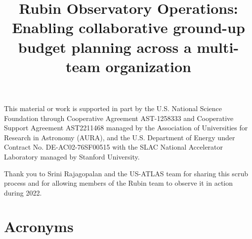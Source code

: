 \documentclass[]{spie}
\begin{document}

\title{Rubin Observatory Operations: Enabling collaborative ground-up budget planning across a multi-team organization}


\maketitle






\acknowledgments
This material or work is supported in part by the U.S. National Science Foundation through Cooperative Agreement AST-1258333 and Cooperative Support Agreement AST2211468 managed by the Association of Universities for Research in Astronomy (AURA), and the U.S. Department of Energy under Contract No. DE-AC02-76SF00515 with the SLAC National Accelerator Laboratory managed by Stanford University.

Thank you to Srini Rajagopalan and the US-ATLAS team for sharing this scrub process and for allowing members of the Rubin team to observe it in action during 2022.



\pagebreak
\section*{Acronyms} \label{sec:acronyms}

\end{document}
